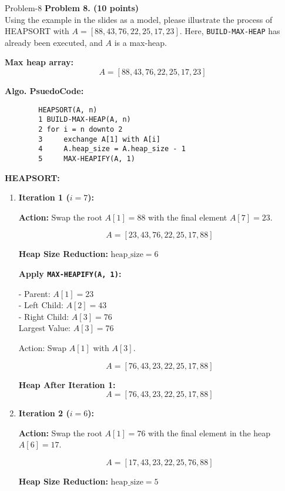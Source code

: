 \begin{problem}{}{Problem-8}
	\textbf{Problem 8. (10 points)} \\
	Using the example in the slides as a model, please illustrate the process of HEAPSORT with \( A = [88, 43, 76, 22, 25, 17, 23] \). Here, \texttt{BUILD-MAX-HEAP} has already been executed, and \( A \) is a max-heap.
	
	\textbf{Max heap array:}
	\[
	A = [88, 43, 76, 22, 25, 17, 23]
	\]
	
	\textbf{Algo. PsuedoCode:}
	\begin{verbatim}
		HEAPSORT(A, n)
		1 BUILD-MAX-HEAP(A, n)
		2 for i = n downto 2
		3     exchange A[1] with A[i]
		4     A.heap_size = A.heap_size - 1
		5     MAX-HEAPIFY(A, 1)
	\end{verbatim}
	
	\textbf{HEAPSORT:}
	
	\begin{enumerate}[label=(\roman*)]
		\item \textbf{Iteration 1 (\( i = 7 \)):}
		
		\textbf{Action:} Swap the root \( A[1] = 88 \) with the final element \( A[7] = 23 \).
		
		\[
		A = [23, 43, 76, 22, 25, 17, 88]
		\]
		
		\textbf{Heap Size Reduction:} \( \text{heap\_size} = 6 \)
		
		\textbf{Apply \texttt{MAX-HEAPIFY(A, 1)}:}
		
		- Parent: \( A[1] = 23 \)\\
		- Left Child: \( A[2] = 43 \)\\
		- Right Child: \( A[3] = 76 \)\\
		
		Largest Value: \( A[3] = 76 \)
		
		Action: Swap \( A[1] \) with \( A[3] \).
		
		\[
		A = [76, 43, 23, 22, 25, 17, 88]
		\]
		
		\textbf{Heap After Iteration 1:}
		\[
		A = [76, 43, 23, 22, 25, 17, 88]
		\]
		
		\item \textbf{Iteration 2 (\( i = 6 \)):}
		
		\textbf{Action:} Swap the root \( A[1] = 76 \) with the final element in the heap \( A[6] = 17 \).
		
		\[
		A = [17, 43, 23, 22, 25, 76, 88]
		\]
		
		\textbf{Heap Size Reduction:} \( \text{heap\_size} = 5 \)
		

\end{enumerate}
\end{problem}
